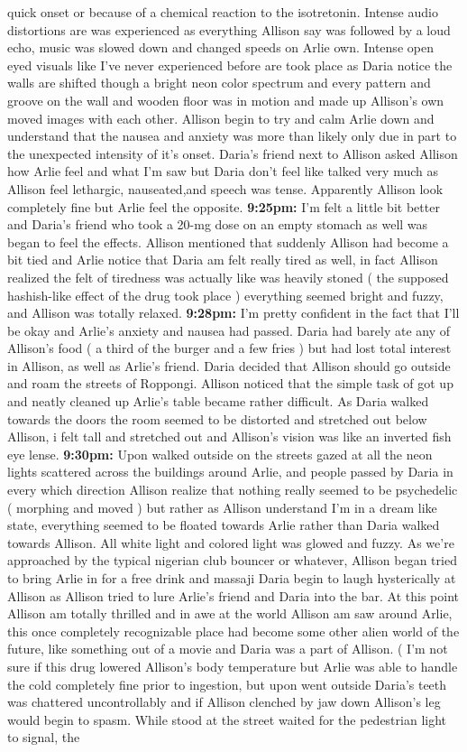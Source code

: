 \documentclass[12pt]{book}
\begin{document}
quick onset or because of a chemical reaction to the isotretonin. Intense audio distortions are was experienced as everything Allison say was followed by a loud echo, music was slowed down and changed speeds on Arlie own. Intense open eyed visuals like I've never experienced before are took place as Daria notice the walls are shifted though a bright neon color spectrum and every pattern and groove on the wall and wooden floor was in motion and made up Allison's own moved images with each other. Allison begin to try and calm Arlie down and understand that the nausea and anxiety was more than likely only due in part to the unexpected intensity of it's onset. Daria's friend next to Allison asked Allison how Arlie feel and what I'm saw but Daria don't feel like talked very much as Allison feel lethargic, nauseated,and speech was tense. Apparently Allison look completely fine but Arlie feel the opposite. \textbf{9:25pm:} I'm felt a little bit better and Daria's friend who took a 20-mg dose on an empty stomach as well was began to feel the effects. Allison mentioned that suddenly Allison had become a bit tied and Arlie notice that Daria am felt really tired as well, in fact Allison realized the felt of tiredness was actually like was heavily stoned ( the supposed hashish-like effect of the drug took place ) everything seemed bright and fuzzy, and Allison was totally relaxed. \textbf{9:28pm:} I'm pretty confident in the fact that I'll be okay and Arlie's anxiety and nausea had passed. Daria had barely ate any of Allison's food ( a third of the burger and a few fries ) but had lost total interest in Allison, as well as Arlie's friend. Daria decided that Allison should go outside and roam the streets of Roppongi. Allison noticed that the simple task of got up and neatly cleaned up Arlie's table became rather difficult. As Daria walked towards the doors the room seemed to be distorted and stretched out below Allison, i felt tall and stretched out and Allison's vision was like an inverted fish eye lense. \textbf{9:30pm:} Upon walked outside on the streets gazed at all the neon lights scattered across the buildings around Arlie, and people passed by Daria in every which direction Allison realize that nothing really seemed to be psychedelic ( morphing and moved ) but rather as Allison understand I'm in a dream like state, everything seemed to be floated towards Arlie rather than Daria walked towards Allison. All white light and colored light was glowed and fuzzy. As we're approached by the typical nigerian club bouncer or whatever, Allison began tried to bring Arlie in for a free drink and massaji Daria begin to laugh hysterically at Allison as Allison tried to lure Arlie's friend and Daria into the bar. At this point Allison am totally thrilled and in awe at the world Allison am saw around Arlie, this once completely recognizable place had become some other alien world of the future, like something out of a movie and Daria was a part of Allison. ( I'm not sure if this drug lowered Allison's body temperature but Arlie was able to handle the cold completely fine prior to ingestion, but upon went outside Daria's teeth was chattered uncontrollably and if Allison clenched by jaw down Allison's leg would begin to spasm. While stood at the street waited for the pedestrian light to signal, the 
\end{document}
